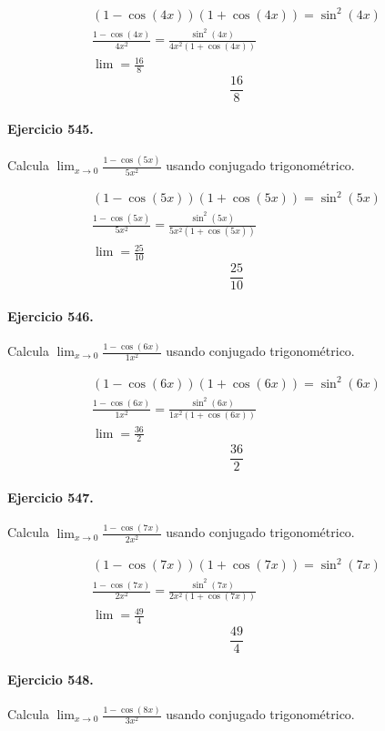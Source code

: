 \documentclass[11pt,a4paper]{article}
\begin{document}
\[
\begin{aligned}
(1-\cos(4x))(1+\cos(4x))=\sin^2(4x)\\
\frac{1-\cos(4x)}{4x^2}=\frac{\sin^2(4x)}{4x^2(1+\cos(4x))}\\
\lim=\frac{16}{8}
\end{aligned}
\]
\[\boxed{\frac{16}{8}}\]


\paragraph{Ejercicio 545.} Calcula $\displaystyle\lim_{x\to0}\frac{1-\cos(5x)}{5x^2}$ usando conjugado trigonométrico.

\[
\begin{aligned}
(1-\cos(5x))(1+\cos(5x))=\sin^2(5x)\\
\frac{1-\cos(5x)}{5x^2}=\frac{\sin^2(5x)}{5x^2(1+\cos(5x))}\\
\lim=\frac{25}{10}
\end{aligned}
\]
\[\boxed{\frac{25}{10}}\]


\paragraph{Ejercicio 546.} Calcula $\displaystyle\lim_{x\to0}\frac{1-\cos(6x)}{1x^2}$ usando conjugado trigonométrico.

\[
\begin{aligned}
(1-\cos(6x))(1+\cos(6x))=\sin^2(6x)\\
\frac{1-\cos(6x)}{1x^2}=\frac{\sin^2(6x)}{1x^2(1+\cos(6x))}\\
\lim=\frac{36}{2}
\end{aligned}
\]
\[\boxed{\frac{36}{2}}\]


\paragraph{Ejercicio 547.} Calcula $\displaystyle\lim_{x\to0}\frac{1-\cos(7x)}{2x^2}$ usando conjugado trigonométrico.

\[
\begin{aligned}
(1-\cos(7x))(1+\cos(7x))=\sin^2(7x)\\
\frac{1-\cos(7x)}{2x^2}=\frac{\sin^2(7x)}{2x^2(1+\cos(7x))}\\
\lim=\frac{49}{4}
\end{aligned}
\]
\[\boxed{\frac{49}{4}}\]


\paragraph{Ejercicio 548.} Calcula $\displaystyle\lim_{x\to0}\frac{1-\cos(8x)}{3x^2}$ usando conjugado trigonométrico.
\end{document}

